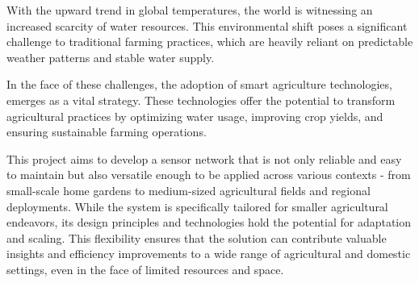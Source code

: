 
With the upward trend in global temperatures, the world is witnessing an increased scarcity of water resources. This environmental shift poses a significant challenge to traditional farming practices, which are heavily reliant on predictable weather patterns and stable water supply. 

In the face of these challenges, the adoption of smart agriculture technologies, emerges as a vital strategy. These technologies offer the potential to transform agricultural practices by optimizing water usage, improving crop yields, and ensuring sustainable farming operations.

This project aims to develop a sensor network that is not only reliable and easy to maintain but also versatile enough to be applied across various contexts - from small-scale home gardens to medium-sized agricultural fields and regional deployments. While the system is specifically tailored for smaller agricultural endeavors, its design principles and technologies hold the potential for adaptation and scaling. This flexibility ensures that the solution can contribute valuable insights and efficiency improvements to a wide range of agricultural and domestic settings, even in the face of limited resources and space.

